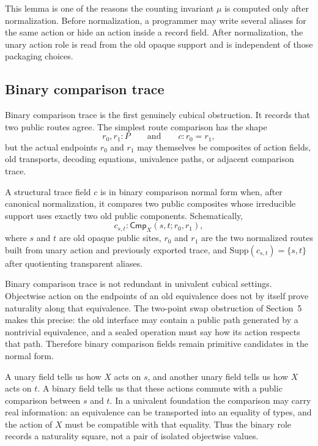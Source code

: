 \documentclass{lmcs}
\begin{document}
This lemma is one of the reasons the counting invariant \(\mu\) is computed only after
normalization.  Before normalization, a programmer may write several aliases for the same
action or hide an action inside a record field.  After normalization, the unary action role is
read from the old opaque support and is independent of those packaging choices.

\subsection{Binary comparison trace}

Binary comparison trace is the first genuinely cubical obstruction.  It records that two
public routes agree.  The simplest route comparison has the shape
\[
  r_0,r_1 : P
  \qquad\text{and}\qquad
  c : r_0 = r_1,
\]
but the actual endpoints \(r_0\) and \(r_1\) may themselves be composites of action fields,
old transports, decoding equations, univalence paths, or adjacent comparison trace.

\begin{defi}
A structural trace field \(c\) is in binary comparison normal form when, after canonical
normalization, it compares two public composites whose irreducible support uses exactly two
old public components.  Schematically,
\[
  c_{s,t} : \mathsf{Cmp}_X(s,t;r_0,r_1),
\]
where \(s\) and \(t\) are old opaque public sites, \(r_0\) and \(r_1\) are the two normalized
routes built from unary action and previously exported trace, and
\(\mathrm{Supp}(c_{s,t})=\{s,t\}\) after quotienting transparent aliases.
\end{defi}

Binary comparison trace is not redundant in univalent cubical settings.  Objectwise action
on the endpoints of an old equivalence does not by itself prove naturality along that
equivalence.  The two-point swap obstruction of Section~5 makes this precise: the old
interface may contain a public path generated by a nontrivial equivalence, and a sealed
operation must say how its action respects that path.  Therefore binary comparison fields
remain primitive candidates in the normal form.

\begin{rem}
A unary field tells us how \(X\) acts on \(s\), and another unary field tells us how \(X\) acts
on \(t\).  A binary field tells us that these actions commute with a public comparison between
\(s\) and \(t\).  In a univalent foundation the comparison may carry real information: an
equivalence can be transported into an equality of types, and the action of \(X\) must be
compatible with that equality.  Thus the binary role records a naturality square, not a pair
of isolated objectwise values.
\end{rem}
\end{document}
